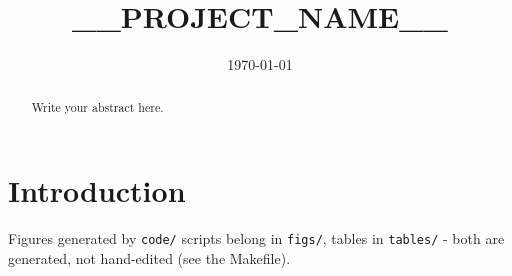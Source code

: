 \documentclass[11pt]{article}
\title{__PROJECT_NAME__}
\author{}
\date{\today}
\begin{document}
\maketitle

\begin{abstract}
Write your abstract here.
\end{abstract}

\section{Introduction}

Figures generated by \texttt{code/} scripts belong in \texttt{figs/}, tables
in \texttt{tables/} - both are generated, not hand-edited (see the Makefile).

\printbibliography
\end{document}
